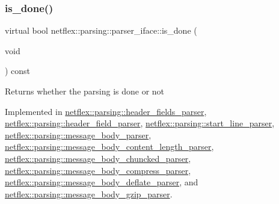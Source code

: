 \subsubsection{\texorpdfstring{is\+\_\+done()}{is\_done()}}
{\footnotesize\ttfamily virtual bool netflex\+::parsing\+::parser\+\_\+iface\+::is\+\_\+done (\begin{DoxyParamCaption}\item[{void}]{ }\end{DoxyParamCaption}) const\hspace{0.3cm}{\ttfamily [pure virtual]}}

\begin{DoxyReturn}{Returns}
whether the parsing is done or not 
\end{DoxyReturn}


Implemented in \hyperlink{classnetflex_1_1parsing_1_1header__fields__parser_a8303c3f2910b9baa68b9b0313e0438cf}{netflex\+::parsing\+::header\+\_\+fields\+\_\+parser}, \hyperlink{classnetflex_1_1parsing_1_1header__field__parser_a59cc97a4d2104217d23a4d54a31f072f}{netflex\+::parsing\+::header\+\_\+field\+\_\+parser}, \hyperlink{classnetflex_1_1parsing_1_1start__line__parser_a7b32cf1d39bfaa78d76dff258d984f95}{netflex\+::parsing\+::start\+\_\+line\+\_\+parser}, \hyperlink{classnetflex_1_1parsing_1_1message__body__parser_a71557821eaea2a6b629f86165fbc2f52}{netflex\+::parsing\+::message\+\_\+body\+\_\+parser}, \hyperlink{classnetflex_1_1parsing_1_1message__body__content__length__parser_abe03e2f2d6f61076cf147a4bcd7f80c5}{netflex\+::parsing\+::message\+\_\+body\+\_\+content\+\_\+length\+\_\+parser}, \hyperlink{classnetflex_1_1parsing_1_1message__body__chuncked__parser_ac5c76b0a25903f6ab1fd4050446175b4}{netflex\+::parsing\+::message\+\_\+body\+\_\+chuncked\+\_\+parser}, \hyperlink{classnetflex_1_1parsing_1_1message__body__compress__parser_ad963822a3d7ae17704fd7732925837f9}{netflex\+::parsing\+::message\+\_\+body\+\_\+compress\+\_\+parser}, \hyperlink{classnetflex_1_1parsing_1_1message__body__deflate__parser_a2e80b1cc5a930497653e200c72adc4e5}{netflex\+::parsing\+::message\+\_\+body\+\_\+deflate\+\_\+parser}, and \hyperlink{classnetflex_1_1parsing_1_1message__body__gzip__parser_a7751bc115acc99af5ab7d8f1a6de5581}{netflex\+::parsing\+::message\+\_\+body\+\_\+gzip\+\_\+parser}.

\mbox{\label{classnetflex_1_1parsing_1_1parser__iface_a6b092567e70a5c0bf7568e94d06f7154}} 
